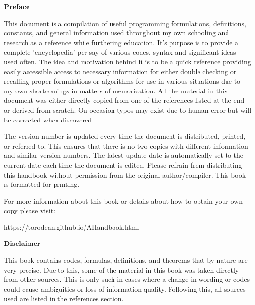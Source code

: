 \begin{center}
	\textbf{Preface}
\end{center}

This document is a compilation of useful programming formulations, definitions, constants, and general information used throughout my own schooling and research as a reference while furthering education. It's purpose is to provide a complete 'encyclopedia' per say of various codes, syntax and significant ideas used often. The idea and motivation behind it is to be a quick reference providing easily accessible access to necessary information for either double checking or recalling proper formulations or algorithms for use in various situations due to my own shortcomings in matters of memorization. All the material in this document was either directly copied from one of the references listed at the end or derived from scratch. On occasion typos may exist due to human error but will be corrected when discovered.
	
The version number is updated every time the document is distributed, printed, or referred to. This ensures that there is no two copies with different information and similar version numbers. The latest update date is automatically set to the current date each time the document is edited. Please refrain from distributing this handbook without permission from the original author/compiler. This book is formatted for printing.

For more information about this book or details about how to obtain your own copy please visit:
\begin{center}
	https://torodean.github.io/AHandbook.html
\end{center}
\begin{center}
	\textbf{Disclaimer}
\end{center}

This book contains codes, formulas, definitions, and theorems that by nature are very precise. Due to this, some of the material in this book was taken directly from other sources. This is only such in cases where a change in wording or codes could cause ambiguities or loss of information quality.  Following this, all sources used are listed in the references section.